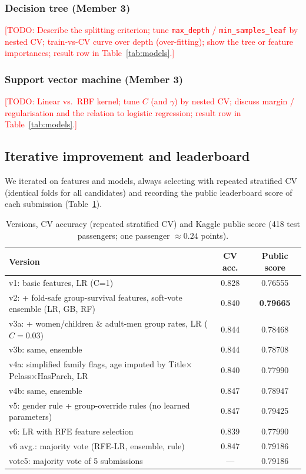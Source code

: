\documentclass[10pt,twocolumn]{article}
\newcommand{\todo}[1]{\textcolor{red}{[TODO: #1]}}
\begin{document}
\subsubsection{Decision tree (Member 3)}
\todo{Describe the splitting criterion; tune \texttt{max\_depth} / \texttt{min\_samples\_leaf} by nested CV; train-vs-CV curve over depth (over-fitting); show the tree or feature importances; result row in Table~\ref{tab:models}.}
\subsubsection{Support vector machine (Member 3)}
\todo{Linear vs.\ RBF kernel; tune $C$ (and $\gamma$) by nested CV; discuss margin / regularisation and the relation to logistic regression; result row in Table~\ref{tab:models}.}

\subsection{Iterative improvement and leaderboard}\label{sec:iter}
We iterated on features and models, always selecting with repeated stratified CV (identical folds for all candidates)
and recording the public leaderboard score of each submission (Table~\ref{tab:versions}).
\begin{table}[t]
\centering
\caption{Versions, CV accuracy (repeated stratified CV) and Kaggle public score (418 test passengers; one passenger $\approx 0.24$ points).}
\label{tab:versions}
\small
\begin{tabular}{p{3.9cm}cc}
\toprule
Version & CV acc. & Public score \\
\midrule
v1: basic features, LR (C=1) & 0.828 & 0.76555 \\
v2: + fold-safe group-survival features, soft-vote ensemble (LR, GB, RF) & 0.840 & \textbf{0.79665} \\
v3a: + women/children \& adult-men group rates, LR ($C{=}0.03$) & 0.844 & 0.78468 \\
v3b: same, ensemble & 0.844 & 0.78708 \\
v4a: simplified family flags, age imputed by Title$\times$Pclass$\times$HasParch, LR & 0.840 & 0.77990 \\
v4b: same, ensemble & 0.847 & 0.78947 \\
v5: gender rule + group-override rules (no learned parameters) & 0.847 & 0.79425 \\
v6: LR with RFE feature selection & 0.839 & 0.77990 \\
v6 avg.: majority vote (RFE-LR, ensemble, rule) & 0.847 & 0.79186 \\
vote5: majority vote of 5 submissions & --- & 0.79186 \\
\bottomrule
\end{tabular}
\end{table}
\end{document}
